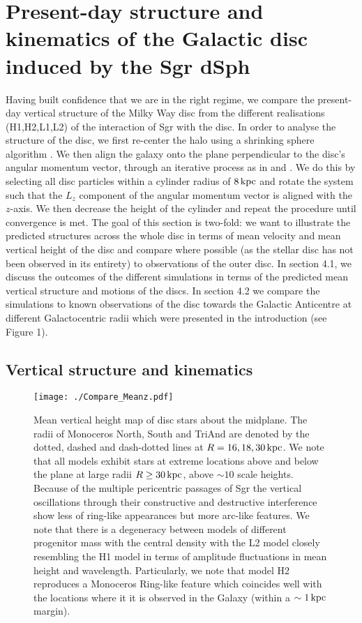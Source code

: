 \documentclass[useAMS,usenatbib]{mnras}
\begin{document}
\section{Present-day structure and kinematics of the Galactic disc induced by the Sgr dSph}

Having built confidence that we are in the right regime, we compare the present-day vertical structure of the Milky Way disc from the different realisations (H1,H2,L1,L2) of the interaction of Sgr with the disc. In order to analyse the structure of the disc, we first re-center the halo using a shrinking sphere algorithm \citep{Power2003}. We then align the galaxy onto the plane perpendicular to the disc's angular momentum vector, through an iterative process as in \cite{gomez13} and \cite{laporte16}. We do this by selecting all disc particles within a cylinder radius of $8 \, \rm{kpc}$ and rotate the system such that the $L_{z}$ component of the angular momentum vector is aligned with the $z$-axis. We then decrease the height of the cylinder and repeat the procedure until convergence is met. The goal of this section is two-fold: we want to illustrate the predicted structures across the whole disc in terms of mean velocity and mean vertical height of the disc and compare where possible (as the stellar disc has not been observed in its entirety) to observations of the outer disc. In section 4.1, we discuss the outcomes of the different simulations in terms of the predicted mean vertical structure and motions of the discs. In section 4.2 we compare the simulations to known observations of the disc towards the Galactic Anticentre at different Galactocentric radii which were presented in the introduction (see Figure 1).

\subsection{Vertical structure and kinematics}

\begin{figure}
\texttt{[image: ./Compare\_Meanz.pdf]}
\caption[]{Mean vertical height map of disc stars about the midplane. The radii of Monoceros North, South and TriAnd are denoted by the dotted, dashed and dash-dotted lines at $R=16,18,30 \,\rm{kpc}$. We note that all models exhibit stars at extreme locations above and below the plane at large radii $R\ge 30\,\rm{kpc}$, above $\sim10$ scale heights. Because of the multiple pericentric passages of Sgr the vertical oscillations through their constructive and destructive interference show less of ring-like appearances but more arc-like features. We note that there is a degeneracy between models of different progenitor mass with the central density with the L2 model closely resembling the H1 model in terms of amplitude fluctuations in mean height and wavelength. Particularly, we note that model H2 reproduces a Monoceros Ring-like feature which coincides well with the locations where it it is observed in the Galaxy (within a $\sim1\, \rm{kpc}$ margin).}
\end{figure}
\end{document}
